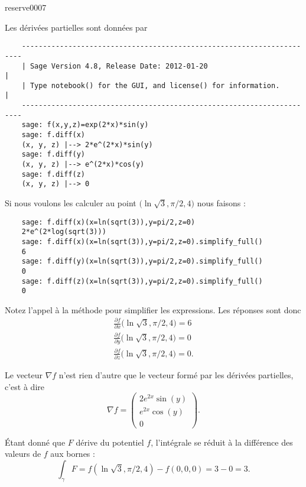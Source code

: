 

\begin{corrige}{reserve0007}

    Les dérivées partielles sont données par
    \begin{verbatim}
    ----------------------------------------------------------------------
    | Sage Version 4.8, Release Date: 2012-01-20                         |
    | Type notebook() for the GUI, and license() for information.        |
    ----------------------------------------------------------------------
    sage: f(x,y,z)=exp(2*x)*sin(y)
    sage: f.diff(x)
    (x, y, z) |--> 2*e^(2*x)*sin(y)
    sage: f.diff(y)
    (x, y, z) |--> e^(2*x)*cos(y)
    sage: f.diff(z)
    (x, y, z) |--> 0
    \end{verbatim}
    Si nous voulons les calculer au point \( \big( \ln\sqrt{3},\pi/2,4 \big)\) nous faisons :
    \begin{verbatim}
    sage: f.diff(x)(x=ln(sqrt(3)),y=pi/2,z=0) 
    2*e^(2*log(sqrt(3)))
    sage: f.diff(x)(x=ln(sqrt(3)),y=pi/2,z=0).simplify_full()
    6
    sage: f.diff(y)(x=ln(sqrt(3)),y=pi/2,z=0).simplify_full()
    0
    sage: f.diff(z)(x=ln(sqrt(3)),y=pi/2,z=0).simplify_full()
    0
    \end{verbatim}
    Notez l'appel à la méthode  pour simplifier les expressions. Les réponses sont donc
    \begin{subequations}
        \begin{align}
            \frac{ \partial f }{ \partial x }\big( \ln\sqrt{3},\pi/2,4 \big)=6\\
            \frac{ \partial f }{ \partial y }\big( \ln\sqrt{3},\pi/2,4 \big)=0\\
            \frac{ \partial f }{ \partial z }\big( \ln\sqrt{3},\pi/2,4 \big)=0.
        \end{align}
    \end{subequations}
    
    Le vecteur \( \nabla f\) n'est rien d'autre que le vecteur formé par les dérivées partielles, c'est à dire
    \begin{equation}
        \nabla f=\begin{pmatrix}
            2 e^{2x}\sin(y)    \\ 
            e^{2x}\cos(y)    \\ 
            0    
        \end{pmatrix}.
    \end{equation}
    
    Étant donné que \( F\) dérive du potentiel \( f\), l'intégrale se réduit à la différence des valeurs de \( f\) aux bornes :
    \begin{equation}
        \int_{\gamma}F=f(\ln\sqrt{3},\pi/2,4)-f(0,0,0)=3-0=3.
    \end{equation}

\end{corrige}

